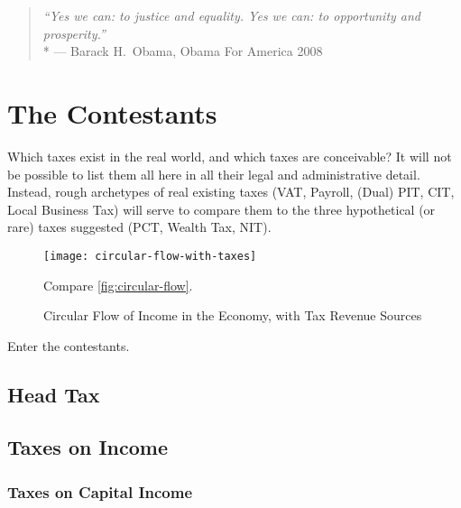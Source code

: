 

\begin{quote}
	\emph{``Yes we can:
	to justice and equality.
	Yes we can:
	to opportunity and prosperity.''}
	\\*
	--- Barack H.\ Obama, Obama For America 2008
\end{quote}

\section{The Contestants} \label{sec:contestants} Which taxes exist in the real world, and which taxes are conceivable?
It will not be possible to list them all here in all their legal and administrative detail.
Instead, rough archetypes of real existing taxes (VAT, Payroll, (Dual) PIT, CIT, Local Business Tax) will serve to compare them to the three hypothetical (or rare) taxes suggested (PCT, Wealth Tax, NIT).



\begin{figure}[htbp]
	\centering
	\texttt{[image: circular-flow-with-taxes]}
	\caption[Circular Flow in the Economy, with Taxes]{Circular Flow of Income in the Economy, with Tax Revenue Sources}
	\begin{flushleft}
		\scriptsize{Compare \autoref{fig:circular-flow}.}
		
	\end{flushleft}
	\label{fig:circular-flow-with-taxes}
\end{figure}

Enter the contestants.

\subsection{Head Tax}

\subsection{Taxes on Income}

\subsubsection{Taxes on Capital Income}

